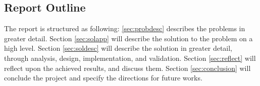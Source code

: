\subsection{Report Outline}
The report is structured as following: \autoref{sec:probdesc} describes the problems in greater detail. Section \ref{sec:solapp} will describe the solution to the problem on a high level. Section \ref{sec:soldesc} will describe the solution in greater detail, through analysis, design, implementation, and validation. Section \ref{sec:reflect} will reflect upon the achieved results, and discuss them. Section \ref{sec:conclusion} will conclude the project and specify the directions for future works.